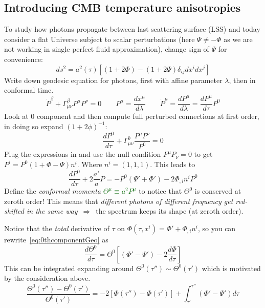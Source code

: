 \subsection{Introducing CMB temperature anisotropies}\label{sec:CMBAnisotropies}
To study how photons propagate between last scattering surface (LSS) and today consider a flat Universe subject to scalar perturbations (here $\Psi \neq -\Phi$ as we are not working in single perfect fluid approximation), change sign of $\Psi$ for convenience:
\begin{equation}
    ds^2 = a^2(\tau)\left[\left(1+2\Phi\right) - \left(1+2\Psi\right) \delta_{ij} dx^idx^j\right]
\end{equation}
Write down geodesic equation for photons, first with affine parameter $\lambda$, then in conformal time.
\begin{equation}
    \dot{P}^\beta + \Gamma^\beta_{\mu\nu}P^\mu P^\nu = 0 \qquad P^\mu= \frac{dx^\mu}{d \lambda} \qquad \dot{P}^\mu= \frac{dP^\mu}{d \lambda} = \frac{dP^\mu}{d \tau} P^0
\end{equation}
Look at $0$ component and then compute full perturbed connections at first order, in doing so expand $(1+2\phi)^{-1}$:
\begin{equation}
   \frac{dP^0}{d \tau} + \Gamma^0_{\mu\nu}\frac{P^\mu P^\nu}{P^0} = 0 
\end{equation}
Plug the expressions in and use the null condition $P^{\mu}P_{\nu}=0$ to get $P^i = P^0 \left(1+\Phi -\Psi \right) n^i$. 
Where $n^i = (1,1,1)$. This leads to 
\begin{equation}\label{eq:0thcomponentGeo}
    \frac{dP^0}{d \tau} + 2\frac{a'}{a}P = -P^0 \left(\Psi'+\Phi'\right) -2\Phi_{,i}n^i P^0
\end{equation}
Define the \textit{conformal momenta} \textcolor{darkgreen}{$\varTheta^\mu \equiv  a^2 P^\mu $} to notice that $\varTheta^0$ is conserved at zeroth order! This means that 
\emph{different photons of different frequency get red-shifted in the same way} $\,\Rightarrow\,$ the spectrum keeps its shape (at zeroth order).

Notice that the \emph{total} derivative of $\tau$ on $\Phi(\tau,x^i) = \Phi'+ \Phi_{,i}n^i$, so you can rewrite~\eqref{eq:0thcomponentGeo} as
\begin{equation}
    \frac{d\varTheta^0}{d \tau} = \varTheta^0 \left[\left(\Phi' - \Psi' \right) - 2  \frac{d\Phi}{d\tau}\right]
\end{equation}
This can be integrated expanding around $\varTheta^0(\tau'') \sim  \varTheta^0(\tau')$ which is motivated by the consideration above.
\begin{equation}
    \frac{\Theta^{0}(\tau'')-\Theta^{0}(\tau')}{\Theta^{0}(\tau')} = - 2\left[\Phi(\tau'')-\Phi(\tau')\right] + \int_{\tau'}^{\tau''} \left(\Phi'-\Psi'\right)d\tau 
\end{equation}

